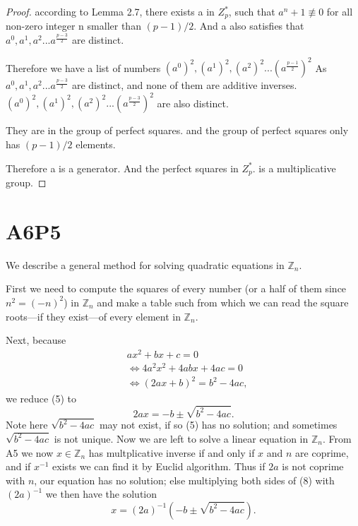 \documentclass{article}
\begin{document}
\begin{proof}
according to Lemma 2.7, there exists a in $Z^*_p$, such that $a^n + 1 \not \equiv 0$ for all non-zero integer n smaller than $(p-1)/2$. And a also satisfies that $a^0, a^1, a^2...a^\frac{p-3}{2}$ are distinct.

Therefore we have a list of numbers
$(a^0)^2,(a^1)^2, (a^2)^2...(a^\frac{p-1}{2})^2$ 
As $a^0, a^1, a^2...a^\frac{p-3}{2}$ are distinct, and none of them are additive inverses. $(a^0)^2, (a^1)^2, (a^2)^2...(a^\frac{p-3}{2})^2$ are also distinct.

They are in the group of perfect squares.
and the group of perfect squares only has
$(p-1)/2$ elements. 

Therefore a is a generator. And the perfect squares in $Z^*_p.$ is a multiplicative group.
 \end{proof}


\section{A6P5}
We describe a general method for solving quadratic equations in $\mathbb{Z}_n$. 

First we need to compute the squares of every number (or a half of them since $n^2 = (-n)^2$) in $\mathbb{Z}_n$ and make a table such from which we can read the square roots---if they exist---of every element in $\mathbb{Z}_n$.

Next, because
\begin{align}
    &ax^2+bx+c = 0\\
    &\Leftrightarrow 4a^2x^2+4abx+4ac = 0\\
    &\Leftrightarrow (2ax+b)^2
    =b^2-4ac,
\end{align}
we reduce (5) to 
\begin{equation}2ax = -b \pm \sqrt{b^2-4ac}.\end{equation}
Note here $\sqrt{b^2-4ac}$ may not exist, if so (5) has no solution; and sometimes $\sqrt{b^2-4ac}$ is not unique. Now we are left to solve a linear equation in $\mathbb{Z}_n$. From A5 we now $x \in \mathbb{Z}_n$ has multplicative inverse if and only if $x$ and $n$ are coprime, and if $x^{-1}$ exists we can find it by Euclid algorithm. Thus if $2a$ is not coprime with $n$, our equation has no solution; else multiplying both sides of (8) with $(2a)^{-1}$ we then have the solution
\begin{equation}
    x = (2a)^{-1} (-b \pm \sqrt{b^2-4ac}).
\end{equation}
\end{document}

